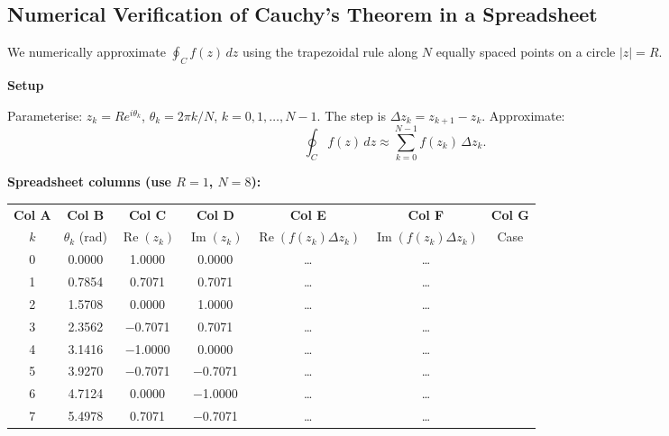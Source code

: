 \documentclass[12pt,a4paper]{article}
\begin{document}
\subsection*{Numerical Verification of Cauchy's Theorem in a Spreadsheet}

We numerically approximate $\oint_{C} f(z)\,dz$ using the trapezoidal rule along
$N$ equally spaced points on a circle $|z| = R$.

\medskip
\noindent\textbf{Setup}

Parameterise: $z_k = R e^{i\theta_k}$, $\theta_k = 2\pi k/N$, $k = 0, 1, \ldots, N-1$.
The step is $\Delta z_k = z_{k+1} - z_k$.
Approximate:
\[
  \oint_{C} f(z)\,dz \approx \sum_{k=0}^{N-1} f(z_k)\,\Delta z_k.
\]

\medskip
\noindent\textbf{Spreadsheet columns (use $R=1$, $N=8$):}

\begin{center}
\begin{tabular}{ccccccc}
\toprule
\textbf{Col A} & \textbf{Col B} & \textbf{Col C} & \textbf{Col D} & \textbf{Col E} & \textbf{Col F} & \textbf{Col G} \\
$k$ & $\theta_k$ (rad) & $\operatorname{Re}(z_k)$ & $\operatorname{Im}(z_k)$ & $\operatorname{Re}(f(z_k)\Delta z_k)$ & $\operatorname{Im}(f(z_k)\Delta z_k)$ & Case \\
\midrule
0 & 0.0000 & 1.0000 & 0.0000 & \ldots & \ldots & \\
1 & 0.7854 & 0.7071 & 0.7071 & \ldots & \ldots & \\
2 & 1.5708 & 0.0000 & 1.0000 & \ldots & \ldots & \\
3 & 2.3562 & $-$0.7071 & 0.7071 & \ldots & \ldots & \\
4 & 3.1416 & $-$1.0000 & 0.0000 & \ldots & \ldots & \\
5 & 3.9270 & $-$0.7071 & $-$0.7071 & \ldots & \ldots & \\
6 & 4.7124 & 0.0000 & $-$1.0000 & \ldots & \ldots & \\
7 & 5.4978 & 0.7071 & $-$0.7071 & \ldots & \ldots & \\
\bottomrule
\end{tabular}
\end{center}
\end{document}
